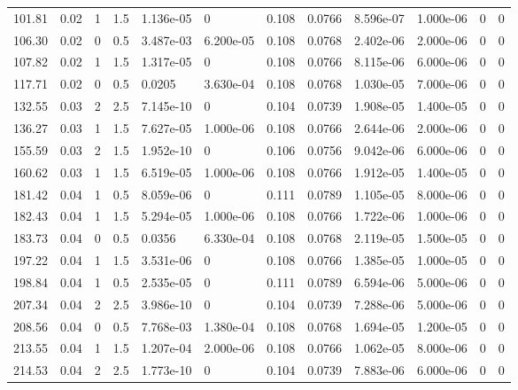 \documentclass[preview]{standalone}
\begin{document}
{{\begin{tabular}{L{1.2cm}C{1.2cm} C{0.3cm}C{0.5cm} C{1.4cm}C{1.4cm} C{1.4cm}C{1.4cm} C{1.6cm}C{1.6cm} C{1.6cm}C{1.6cm}}
  101.81  &  0.02  & 1     & 1.5 &  1.136e-05  & 0  &  0.108&   0.0766& 8.596e-07 & 1.000e-06   &  0 & 0  \\ 
  106.30  &  0.02  & 0     & 0.5 &  3.487e-03  & 6.200e-05  &  0.108&   0.0768& 2.402e-06 & 2.000e-06   &  0 & 0  \\ 
  107.82  &  0.02  & 1     & 1.5 &  1.317e-05  & 0  &  0.108&   0.0766& 8.115e-06 & 6.000e-06   &  0 & 0  \\ 
  117.71  &  0.02  & 0     & 0.5 &  0.0205  & 3.630e-04  &  0.108&   0.0768& 1.030e-05 & 7.000e-06   &  0 & 0  \\ 
  132.55  &  0.03  & 2     & 2.5 &  7.145e-10  & 0  &  0.104&   0.0739& 1.908e-05 & 1.400e-05   &  0 & 0  \\ 
  136.27  &  0.03  & 1     & 1.5 &  7.627e-05  & 1.000e-06  &  0.108&   0.0766& 2.644e-06 & 2.000e-06   &  0 & 0  \\ 
  155.59  &  0.03  & 2     & 1.5 &  1.952e-10  & 0  &  0.106&   0.0756& 9.042e-06 & 6.000e-06   &  0 & 0  \\ 
  160.62  &  0.03  & 1     & 1.5 &  6.519e-05  & 1.000e-06  &  0.108&   0.0766& 1.912e-05 & 1.400e-05   &  0 & 0  \\ 
  181.42  &  0.04  & 1     & 0.5 &  8.059e-06  & 0  &  0.111&   0.0789& 1.105e-05 & 8.000e-06   &  0 & 0  \\ 
  182.43  &  0.04  & 1     & 1.5 &  5.294e-05  & 1.000e-06  &  0.108&   0.0766& 1.722e-06 & 1.000e-06   &  0 & 0  \\ 
  183.73  &  0.04  & 0     & 0.5 &  0.0356  & 6.330e-04  &  0.108&   0.0768& 2.119e-05 & 1.500e-05   &  0 & 0  \\ 
  197.22  &  0.04  & 1     & 1.5 &  3.531e-06  & 0  &  0.108&   0.0766& 1.385e-05 & 1.000e-05   &  0 & 0  \\ 
  198.84  &  0.04  & 1     & 0.5 &  2.535e-05  & 0  &  0.111&   0.0789& 6.594e-06 & 5.000e-06   &  0 & 0  \\ 
  207.34  &  0.04  & 2     & 2.5 &  3.986e-10  & 0  &  0.104&   0.0739& 7.288e-06 & 5.000e-06   &  0 & 0  \\ 
  208.56  &  0.04  & 0     & 0.5 &  7.768e-03  & 1.380e-04  &  0.108&   0.0768& 1.694e-05 & 1.200e-05   &  0 & 0  \\ 
  213.55  &  0.04  & 1     & 1.5 &  1.207e-04  & 2.000e-06  &  0.108&   0.0766& 1.062e-05 & 8.000e-06   &  0 & 0  \\ 
  214.53  &  0.04  & 2     & 2.5 &  1.773e-10  & 0  &  0.104&   0.0739& 7.883e-06 & 6.000e-06   &  0 & 0  \\ 

\end{tabular}}}
\end{document}
